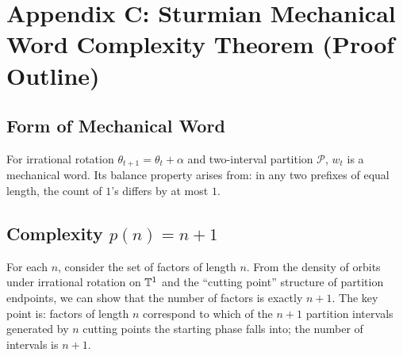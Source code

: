 \section{Appendix C: Sturmian Mechanical Word Complexity Theorem (Proof Outline)}
\label{app:sturmian-outline}

\subsection{Form of Mechanical Word}

For irrational rotation $\theta_{t+1}=\theta_t+\alpha$ and two-interval partition $\mathcal{P}$, $w_t$ is a mechanical word. Its balance property arises from: in any two prefixes of equal length, the count of $1$'s differs by at most $1$.

\subsection{\texorpdfstring{Complexity $p(n)=n+1$}{Complexity p(n)=n+1}}

For each $n$, consider the set of factors of length $n$. From the density of orbits under irrational rotation on $\mathbb{T}^1$ and the ``cutting point'' structure of partition endpoints, we can show that the number of factors is exactly $n+1$. The key point is: factors of length $n$ correspond to which of the $n+1$ partition intervals generated by $n$ cutting points the starting phase falls into; the number of intervals is $n+1$.
